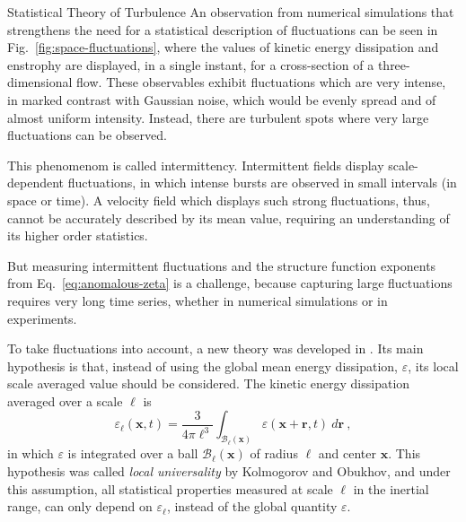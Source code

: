\begin{chapter}{Statistical Theory of Turbulence}
An observation from numerical simulations that strengthens the need
for a statistical description of fluctuations can be seen in
Fig.~\ref{fig:space-fluctuations}, where the values of kinetic
energy dissipation and enstrophy are displayed,
in a single instant, for a cross-section of a three-dimensional flow.
These observables exhibit fluctuations which
are very intense, in marked contrast with Gaussian noise, which would
be evenly spread and of almost uniform intensity.
Instead, there are turbulent spots
where very large fluctuations can be observed.

This phenomenom is called intermittency.
Intermittent fields display scale-dependent fluctuations, in which
intense bursts are observed in small intervals (in space or time).
A velocity field which displays such strong fluctuations, thus,
cannot be accurately described by its mean value, requiring
an understanding of its higher order statistics.

But measuring intermittent fluctuations and the structure
function exponents from Eq.~\eqref{eq:anomalous-zeta}
is a challenge, because capturing large fluctuations requires
very long time series, whether in numerical simulations
or in experiments.

To take fluctuations into account,
a new theory was developed in
\textcite{kolmogorov1961precision,kolmogorov1962refinement,
obukhov1962}.
Its main hypothesis is that,
instead of using the global mean energy dissipation, $\varepsilon$,
its local scale averaged value should be considered.
The kinetic energy dissipation averaged over a scale $\ell$ is
\begin{equation} \label{eq:dissip-coarse}
    \varepsilon_{\ell}(\bm{x},t) = \frac{3}{4 \pi \ell^3}
    \int_{\mathcal{B}_{\ell}(\mathbf{x})} \varepsilon (\bm{x+r},t) \ d \bm{r} \ ,
\end{equation}
in which $\varepsilon$ is integrated over a ball
$\mathcal{B}_{\ell}(\mathbf{x})$ of radius $\ell$ and center $\mathbf{x}$.
This hypothesis was called \textit{local universality} by Kolmogorov and Obukhov, and under this assumption, all statistical properties measured at scale $\ell$ in the inertial range, can only depend on $\varepsilon_{\ell}$, instead of the global quantity $\varepsilon$.


\end{chapter}
